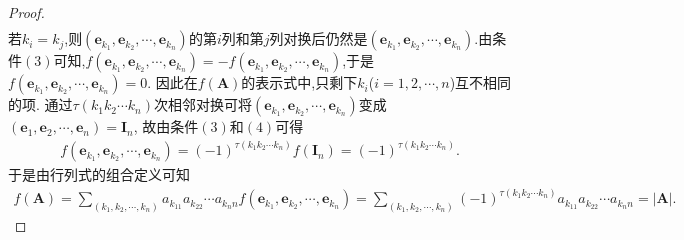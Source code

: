 \documentclass[../../main.tex]{subfiles}%
\begin{document}
\begin{proof}
\begin{align*}
\end{align*}
若\(k_i = k_j\),则\((\boldsymbol{e}_{k_1},\boldsymbol{e}_{k_2},\cdots,\boldsymbol{e}_{k_n})\)的第\(i\)列和第\(j\)列对换后仍然是\((\boldsymbol{e}_{k_1},\boldsymbol{e}_{k_2},\cdots,\boldsymbol{e}_{k_n})\).由条件\((3)\)可知,\(f(\boldsymbol{e}_{k_1},\boldsymbol{e}_{k_2},\cdots,\boldsymbol{e}_{k_n}) = -f(\boldsymbol{e}_{k_1},\boldsymbol{e}_{k_2},\cdots,\boldsymbol{e}_{k_n})\),于是\(f(\boldsymbol{e}_{k_1},\boldsymbol{e}_{k_2},\cdots,\boldsymbol{e}_{k_n}) = 0\).
因此在\(f(\boldsymbol{A})\)的表示式中,只剩下\(k_i\)(\(i = 1,2,\cdots,n\))互不相同的项.
通过\(\tau(k_1k_2\cdots k_n)\)次相邻对换可将\((\boldsymbol{e}_{k_1},\boldsymbol{e}_{k_2},\cdots,\boldsymbol{e}_{k_n})\)变成\((\boldsymbol{e}_1,\boldsymbol{e}_2,\cdots,\boldsymbol{e}_n) = \boldsymbol{I}_n\),
故由条件\((3)\)和\((4)\)可得
\begin{align*}
f(\boldsymbol{e}_{k_1},\boldsymbol{e}_{k_2},\cdots,\boldsymbol{e}_{k_n}) = (-1)^{\tau(k_1k_2\cdots k_n)}f(\boldsymbol{I}_n) = (-1)^{\tau(k_1k_2\cdots k_n)}.
\end{align*}
于是由行列式的组合定义可知
\begin{align*}
f(\boldsymbol{A}) = \sum_{(k_1,k_2,\cdots,k_n)}a_{k_11}a_{k_22}\cdots a_{k_nn}f(\boldsymbol{e}_{k_1},\boldsymbol{e}_{k_2},\cdots,\boldsymbol{e}_{k_n}) = \sum_{(k_1,k_2,\cdots,k_n)}(-1)^{\tau(k_1k_2\cdots k_n)}a_{k_11}a_{k_22}\cdots a_{k_nn} = |\boldsymbol{A}|.
\end{align*}

\end{proof}
\end{document}
